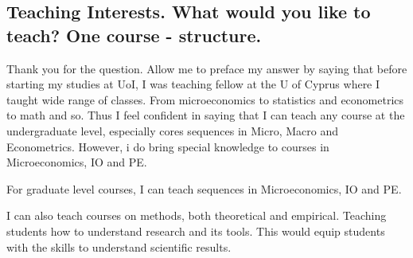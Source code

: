 \documentclass[12pt]{article}
\theoremstyle{plain}
\theoremstyle{plain}
\theoremstyle{plain}
\theoremstyle{plain}
\theoremstyle{plain}
\theoremstyle{plain}
\begin{document}
\subsection{Teaching Interests. What would you like to teach? One course - structure.}
\label{sec:orgb1f9a8b}

Thank you for the question.
Allow me to preface my answer by saying that before starting my studies at UoI, I was teaching fellow at the U of Cyprus where I taught wide range of classes.
From microeconomics to statistics and econometrics to math and so.
Thus I feel confident in saying that I can teach any course at the undergraduate level, especially cores sequences in Micro, Macro and Econometrics.
However, i do bring special knowledge to courses in Microeconomics, IO and PE.

For graduate level courses, I can teach sequences in Microeconomics, IO and PE.

I can also teach courses on methods, both theoretical and empirical.
Teaching students how to understand research and its tools.
This would equip students with the skills to understand scientific results.
\end{document}
